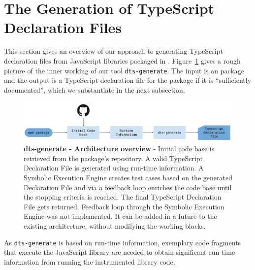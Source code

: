 \documentclass[a4paper,english,cleveref, autoref]{lipics-v2019}
\newcommand{\figref}[1]{Figure~\ref{#1}}
\begin{document}
\section{The Generation of TypeScript Declaration Files}
\label{sec:gener-typescr-decl}
This section gives an overview of our approach to generating
TypeScript declaration files from JavaScript libraries packaged in
\NPM. \figref{fig:tsd_generation_method_block_diagram} gives a rough
picture of the inner working of our tool \texttt{dts-generate}. The
input is an \NPM{} package and the output is a TypeScript declaration
file for the package if it is ``sufficiently documented'', which we
substantiate in the next subsection.


\begin{figure}[tp]
    \centering
    \includegraphics[width=1\linewidth]{dts-generate-block-diagram.pdf}
    \caption[dts-generate - Architecture overview]{\textbf{dts-generate - Architecture overview} - Initial code base is retrieved from the \NPM{} package's repository. A valid TypeScript Declaration File is generated using run-time information. A Symbolic Execution Engine creates test cases based on the generated Declaration File and via a feedback loop enriches the code base until the stopping criteria is reached. The final TypeScript Declaration File gets returned. Feedback loop through the Symbolic Execution Engine was not implemented. It can be added in a future to the existing architecture, without modifying the working blocks.}
    \label{fig:tsd_generation_method_block_diagram}
  \end{figure}

As \texttt{dts-generate} is based on run-time information, 
exemplary code fragments that execute the JavaScript library are
needed to obtain 
significant run-time information from running the instrumented library
code.
\end{document}
